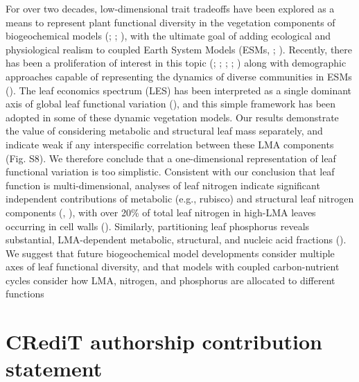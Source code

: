 \documentclass[
  12pt,
  letterpaper,
  DIV=11,
  numbers=noendperiod]{scrartcl}
\begin{document}
For over two decades, low-dimensional trait tradeoffs have been explored
as a means to represent plant functional diversity in the vegetation
components of biogeochemical models (; ;
), with the ultimate
goal of adding ecological and physiological realism to coupled Earth
System Models (ESMs, ;
). Recently,
there has been a proliferation of interest in this topic
(;
;
;
;
) along with
demographic approaches capable of representing the dynamics of diverse
communities in ESMs ().
The leaf economics spectrum (LES) has been interpreted as a single
dominant axis of global leaf functional variation
(), and this simple
framework has been adopted in some of these dynamic vegetation models.
Our results demonstrate the value of considering metabolic and
structural leaf mass separately, and indicate weak if any interspecific
correlation between these LMA components (Fig. S8). We therefore
conclude that a one-dimensional representation of leaf functional
variation is too simplistic. Consistent with our conclusion that leaf
function is multi-dimensional, analyses of leaf nitrogen indicate
significant independent contributions of metabolic (e.g., rubisco) and
structural leaf nitrogen components (, ), with over 20\% of total leaf
nitrogen in high-LMA leaves occurring in cell walls
(). Similarly, partitioning
leaf phosphorus reveals substantial, LMA-dependent metabolic,
structural, and nucleic acid fractions (). We suggest that future biogeochemical model
developments consider multiple axes of leaf functional diversity, and
that models with coupled carbon-nutrient cycles consider how LMA,
nitrogen, and phosphorus are allocated to different functions

\section{CRediT authorship contribution
statement}\label{credit-authorship-contribution-statement}
\end{document}

